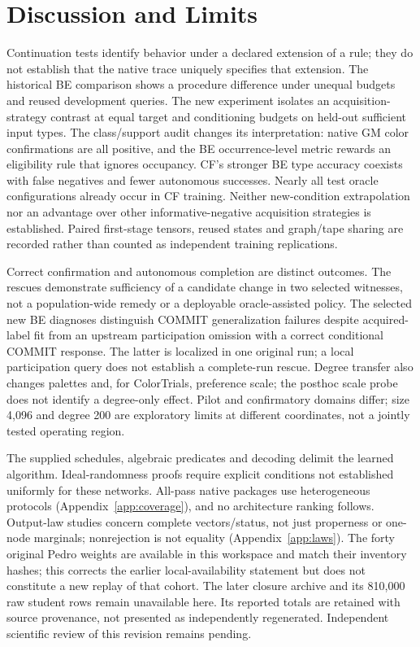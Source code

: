 \documentclass[10pt]{article}
\begin{document}


\section{Discussion and Limits}
Continuation tests identify behavior under a declared extension of a rule;
they do not establish that the native trace uniquely specifies that extension.
The historical BE comparison shows a procedure difference under unequal
budgets and reused development queries. The new experiment isolates an
acquisition-strategy contrast at equal target and conditioning budgets on
held-out sufficient input types. The class/support audit changes its
interpretation: native GM color confirmations are all positive, and the
BE occurrence-level metric rewards an eligibility rule that ignores occupancy.
CF's stronger BE type accuracy coexists with false negatives and fewer
autonomous successes. Nearly all test oracle configurations already occur in
CF training. Neither new-condition extrapolation nor an advantage over other
informative-negative acquisition strategies is established.
Paired first-stage tensors, reused states and graph/tape sharing
are recorded rather than counted as independent training replications.

Correct confirmation and autonomous completion are distinct outcomes. The
rescues demonstrate sufficiency of a candidate change in two selected
witnesses, not a population-wide remedy or a deployable oracle-assisted policy.
The selected new BE diagnoses distinguish COMMIT generalization failures
despite acquired-label fit from an upstream participation omission with a
correct conditional COMMIT response. The latter is localized in one original
run; a local participation query does not establish a complete-run rescue.
Degree transfer also changes palettes and, for ColorTrials, preference scale;
the posthoc scale probe does not identify a degree-only effect. Pilot and
confirmatory domains differ; size 4,096 and degree 200 are exploratory limits
at different coordinates, not a jointly tested operating region.

The supplied schedules, algebraic predicates and decoding delimit the learned
algorithm. Ideal-randomness proofs require explicit conditions not established
uniformly for these networks. All-pass native packages use heterogeneous
protocols (Appendix~\ref{app:coverage}), and no architecture ranking follows.
Output-law studies concern complete vectors/status, not just properness or
one-node marginals; nonrejection is not equality (Appendix~\ref{app:laws}).
The forty original Pedro weights are available in this workspace and match
their inventory hashes; this corrects the earlier local-availability statement
but does not constitute a new replay of that cohort. The later closure archive
and its 810,000 raw student rows remain unavailable here. Its reported totals
are retained with source provenance, not presented as independently regenerated.
Independent scientific review of this revision remains pending.
\end{document}
